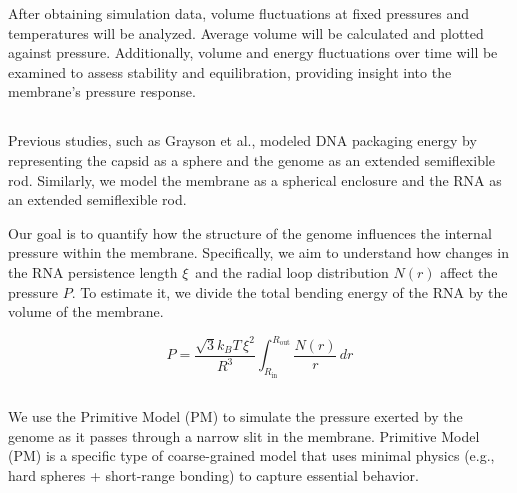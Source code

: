 \documentclass[12pt]{article}
\begin{document}
\begin{flushleft}
After obtaining simulation data, volume fluctuations at fixed pressures and temperatures will be analyzed. Average volume will be calculated and plotted against pressure. Additionally, volume and energy fluctuations over time will be examined to assess stability and equilibration, providing insight into the membrane’s pressure response. 

\subsection*{}

Previous studies, such as Grayson et al.\cite{Grayson2006}, modeled DNA packaging energy by representing the capsid as a sphere and the genome as an extended semiflexible rod. Similarly, we model the membrane as a spherical enclosure and the RNA as an extended semiflexible rod.

Our goal is to quantify how the structure of the genome influences the internal pressure within the membrane. Specifically, we aim to understand how changes in the RNA persistence length  \(\xi\)\ and the radial loop distribution \(N(r)\) affect the pressure \(P\).  To estimate it, we divide the total bending energy of the RNA by the volume of the membrane.  






\begin{equation}
P = \frac{\sqrt{3} k_B T \, \xi^2}{R^3} \int_{R_\text{in}}^{R_\text{out}} \frac{N(r)}{r} \, dr
\end{equation}

\subsection*{}
We use the Primitive Model (PM) to simulate the pressure exerted by the genome as it passes through a narrow slit in the membrane. Primitive Model (PM)	is a specific type of coarse-grained model that uses minimal physics (e.g., hard spheres + short-range bonding) to capture essential behavior.


\end{flushleft}
\end{document}
